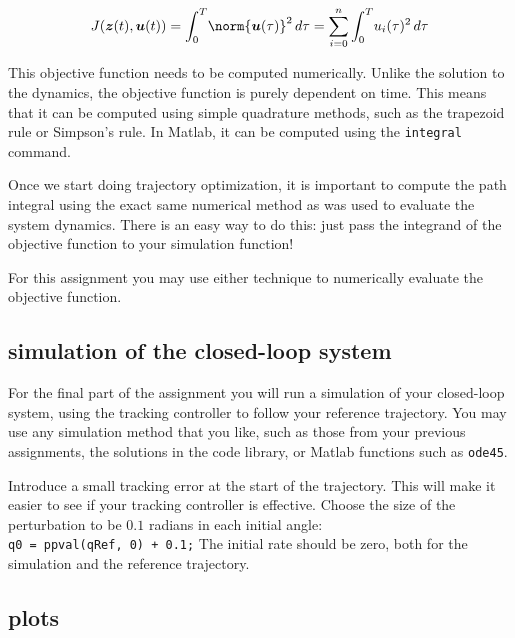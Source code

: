 \begin{equation}
  J(\bm{z}(t), \bm{u}(t))
  = \int_0^T \! \norm{\bm{u}(\tau)}^2 \, d\tau
  = \sum_{i=0}^n \int_0^T \! u_i(\tau)^2 \, d\tau
\end{equation}


This objective function needs to be computed numerically.
Unlike the solution to the dynamics, the objective function is purely dependent on
time. This means that it can be computed using simple quadrature methods,
such as the trapezoid rule or Simpson's rule.
In Matlab, it can be computed using the \texttt{integral} command.

\par
Once we start doing trajectory optimization, it is important to compute the
path integral using the exact same numerical method as was used to evaluate
the system dynamics. There is an easy way to do this: just pass the integrand
of the objective function to your simulation function!

For this assignment you may use either technique to numerically evaluate the objective function.

\subsection*{simulation of the closed-loop system}

For the final part of the assignment you will run a simulation of your closed-loop system,
using the tracking controller to follow your reference trajectory.
You may use any simulation method that you like, such as those from your previous assignments,
the solutions in the code library, or Matlab functions such as \texttt{ode45}.

\par Introduce a small tracking error at the start of the trajectory.
This will make it easier to see if your tracking controller is effective.
Choose the size of the perturbation to be $0.1$ radians in each initial angle: \\
\texttt{q0 = ppval(qRef, 0) + 0.1;}
The initial rate should be zero, both for the simulation and the reference trajectory.

\subsection*{plots}

